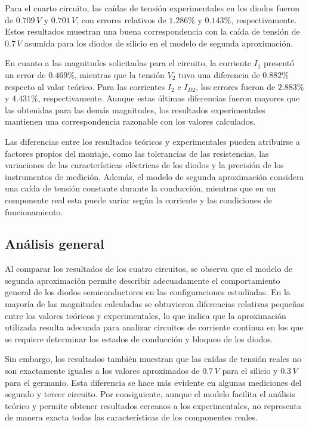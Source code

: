 Para el cuarto circuito, las caídas de tensión experimentales en los diodos fueron de \(0.709\,V\) y \(0.701\,V\), con errores relativos de \(1.286\%\) y \(0.143\%\), respectivamente. Estos resultados muestran una buena correspondencia con la caída de tensión de \(0.7\,V\) asumida para los diodos de silicio en el modelo de segunda aproximación.

\vspace{0.3cm}

En cuanto a las magnitudes solicitadas para el circuito, la corriente \(I_1\) presentó un error de \(0.469\%\), mientras que la tensión \(V_2\) tuvo una diferencia de \(0.882\%\) respecto al valor teórico. Para las corrientes \(I_2\) e \(I_{D2}\), los errores fueron de \(2.883\%\) y \(4.431\%\), respectivamente. Aunque estas últimas diferencias fueron mayores que las obtenidas para las demás magnitudes, los resultados experimentales mantienen una correspondencia razonable con los valores calculados.

\vspace{0.3cm}

Las diferencias entre los resultados teóricos y experimentales pueden atribuirse a factores propios del montaje, como las tolerancias de las resistencias, las variaciones de las características eléctricas de los diodos y la precisión de los instrumentos de medición. Además, el modelo de segunda aproximación considera una caída de tensión constante durante la conducción, mientras que en un componente real esta puede variar según la corriente y las condiciones de funcionamiento.

\subsection{Análisis general}

Al comparar los resultados de los cuatro circuitos, se observa que el modelo de segunda aproximación permite describir adecuadamente el comportamiento general de los diodos semiconductores en las configuraciones estudiadas. En la mayoría de las magnitudes calculadas se obtuvieron diferencias relativas pequeñas entre los valores teóricos y experimentales, lo que indica que la aproximación utilizada resulta adecuada para analizar circuitos de corriente continua en los que se requiere determinar los estados de conducción y bloqueo de los diodos.

\vspace{0.3cm}

Sin embargo, los resultados también muestran que las caídas de tensión reales no son exactamente iguales a los valores aproximados de \(0.7\,V\) para el silicio y \(0.3\,V\) para el germanio. Esta diferencia se hace más evidente en algunas mediciones del segundo y tercer circuito. Por consiguiente, aunque el modelo facilita el análisis teórico y permite obtener resultados cercanos a los experimentales, no representa de manera exacta todas las características de los componentes reales.